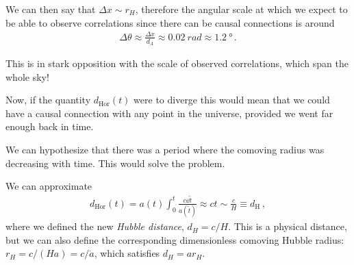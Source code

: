 \documentclass[main.tex]{subfiles}
\begin{document}
We can then say that \(\Delta x \sim r_H\), therefore the angular scale at which we expect to be able to observe correlations since there can be causal connections is around 
%
\begin{align}
\Delta \theta \approx \frac{ \Delta x}{d_A} \approx \SI{0.02}{rad} \approx \SI{1.2}{\degree}
\,.
\end{align}


This is in stark opposition with the scale of observed correlations, which span the whole sky! 







Now, if the quantity \(d _{\text{Hor}}(t)\) were to diverge this would mean that we could have a causal connection with any point in the universe, provided we went far enough back in time. 

We can hypothesize that there was a period where the comoving radius was decreasing with time.
This would solve the problem. 

We can approximate 
%
\begin{align}
  d _{\text{Hor}} (t) = a(t) \int_0^{t} \frac{c \dd{\widetilde{t}} }{a(\widetilde{t})} \approx ct \sim \frac{c}{H} \equiv
  d _{\text{H}}
\,,
\end{align}
%
where we defined the new \emph{Hubble distance}, \(d_H = c/H\).
This is a physical distance, but we can also define the corresponding
dimensionless comoving Hubble radius: \(r_H = c/(Ha) = c / \dot{a} \), which satisfies \(d_H = a r_H\).
\end{document}
